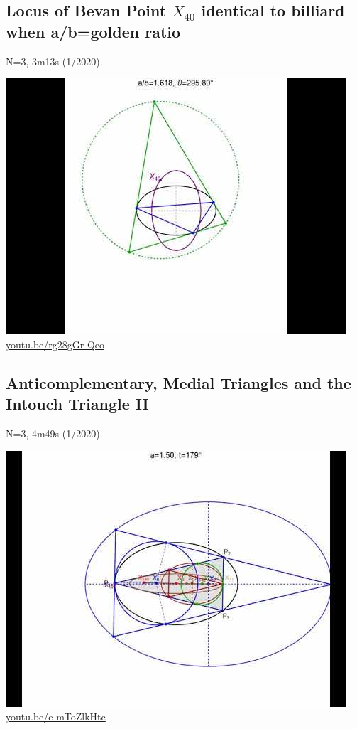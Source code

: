 \documentclass[12pt]{amsart}
\begin{document}
\subsection{Locus of Bevan Point $X_{40}$ identical to billiard when a/b=golden ratio}
\label{vid:rg28gGr-Qeo}
\noindent N=3, 3m13s (1/2020). 
\begin{center}\includegraphics[width=.5\textwidth]{pics/rg28gGr-Qeo.jpg} \\ 
\href{https://youtu.be/rg28gGr-Qeo}{\url{youtu.be/rg28gGr-Qeo}}\end{center}
% 

\subsection{Anticomplementary, Medial Triangles and the Intouch Triangle II}
\label{vid:e-mToZlkHtc}
\noindent N=3, 4m49s (1/2020). 
\begin{center}\includegraphics[width=.5\textwidth]{pics/e-mToZlkHtc.jpg} \\ 
\href{https://youtu.be/e-mToZlkHtc}{\url{youtu.be/e-mToZlkHtc}}\end{center}
% 
\end{document}
